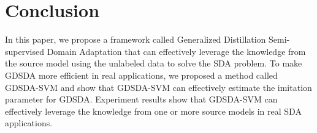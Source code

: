 \documentclass{llncs}
\begin{document}
\section{Conclusion}\label{sec:con}
In this paper, we propose a framework called {Generalized Distillation Semi-supervised Domain Adaptation} that can effectively leverage the knowledge from the source model using the unlabeled data to solve the SDA problem. To make GDSDA more efficient in real applications, we proposed a method called GDSDA-SVM and show that GDSDA-SVM can effectively estimate the imitation parameter for GDSDA. Experiment results show that GDSDA-SVM can effectively leverage the knowledge from one or more source models in real SDA applications.







\end{document}
